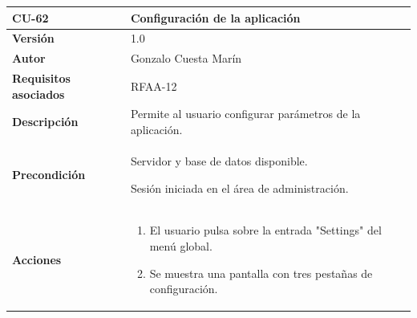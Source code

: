 \documentclass[
]{article}
\providecommand{\tightlist}{%
  \setlength{\itemsep}{0pt}\setlength{\parskip}{0pt}}
\begin{document}
\begin{longtable}[]{@{}ll@{}}
\toprule
\begin{minipage}[b]{0.21\columnwidth}\raggedright
\textbf{CU-62}\strut
\end{minipage} & \begin{minipage}[b]{0.73\columnwidth}\raggedright
\textbf{Configuración de la aplicación}\strut
\end{minipage}\tabularnewline
\midrule
\endhead
\begin{minipage}[t]{0.21\columnwidth}\raggedright
\textbf{Versión}\strut
\end{minipage} & \begin{minipage}[t]{0.73\columnwidth}\raggedright
1.0\strut
\end{minipage}\tabularnewline
\begin{minipage}[t]{0.21\columnwidth}\raggedright
\textbf{Autor}\strut
\end{minipage} & \begin{minipage}[t]{0.73\columnwidth}\raggedright
Gonzalo Cuesta Marín\strut
\end{minipage}\tabularnewline
\begin{minipage}[t]{0.21\columnwidth}\raggedright
\textbf{Requisitos asociados}\strut
\end{minipage} & \begin{minipage}[t]{0.73\columnwidth}\raggedright
RFAA-12\strut
\end{minipage}\tabularnewline
\begin{minipage}[t]{0.21\columnwidth}\raggedright
\textbf{Descripción}\strut
\end{minipage} & \begin{minipage}[t]{0.73\columnwidth}\raggedright
Permite al usuario configurar parámetros de la aplicación.\strut
\end{minipage}\tabularnewline
\begin{minipage}[t]{0.21\columnwidth}\raggedright
\textbf{Precondición}\strut
\end{minipage} & \begin{minipage}[t]{0.73\columnwidth}\raggedright
Servidor y base de datos disponible.

Sesión iniciada en el área de administración.\strut
\end{minipage}\tabularnewline
\begin{minipage}[t]{0.21\columnwidth}\raggedright
\textbf{Acciones}\strut
\end{minipage} & \begin{minipage}[t]{0.73\columnwidth}\raggedright
\begin{enumerate}
\def\labelenumi{\arabic{enumi}.}
\tightlist
\item
  El usuario pulsa sobre la entrada "Settings" del menú global.
\item
  Se muestra una pantalla con tres pestañas de configuración.


\end{enumerate}
\end{minipage}
\end{longtable}
\end{document}
